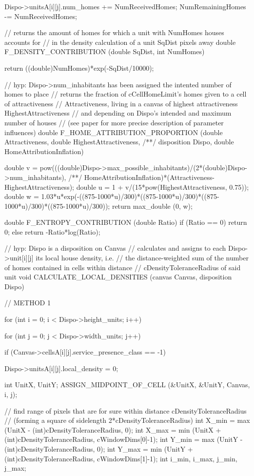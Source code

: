 \begin{C}
{{{			Dispo->unitsA[i][j].num_homes += NumReceivedHomes;
			NumRemainingHomes -= NumReceivedHomes;
		}
	}
	
}

// returns the amount of homes for which a unit with NumHomes houses accounts for
// in the density calculation of a unit SqDist pixels away
double F_DENSITY_CONTRIBUTION (double SqDist, int NumHomes){
	
	return ((double)NumHomes)*exp(-SqDist/10000);
}


// hyp: Dispo->num_inhabitants has been assigned the intented number of homes to place
// returns the fraction of cCellHomeLimit's homes given to a cell of attractiveness
// Attractiveness, living in a canvas of highest attractiveness HighestAttractiveness
// and depending on Dispo's intended and maximum number of houses
// (see paper for more precise description of parameter influences)
double F_HOME_ATTRIBUTION_PROPORTION (double Attractiveness, double HighestAttractiveness,
/**/ disposition Dispo, double HomeAttributionInflation){
	
	double v = pow(((double)Dispo->max_possible_inhabitants)/(2*(double)Dispo->num_inhabitants),
	/**/ HomeAttributionInflation)*(Attractiveness-HighestAttractiveness);
	double u = 1 + v/(15*pow(HighestAttractiveness, 0.75));
	double w = 1.03*u*exp(-((875-1000*u)/300)*((875-1000*u)/300)*((875-1000*u)/300)*((875-1000*u)/300));
	return max_double (0, w);
}


double F_ENTROPY_CONTRIBUTION (double Ratio){
	if (Ratio == 0) return 0;
	else return -Ratio*log(Ratio);
}


// hyp: Dispo is a disposition on Canvas
// calculates and assigns to each Dispo->unit[i][j] its local house density, i.e.
// the distance-weighted sum of the number of homes contained in cells within distance
// cDensityToleranceRadius of said unit
void CALCULATE_LOCAL_DENSITIES (canvas Canvas, disposition Dispo){ // METHOD 1
	
	for (int i = 0; i < Dispo->height_units; i++){
		for (int j = 0; j < Dispo->width_units; j++){
			
			if (Canvas->cellsA[i][j].service_presence_class == -1){
				
				Dispo->unitsA[i][j].local_density = 0;
				
				int UnitX, UnitY;
				ASSIGN_MIDPOINT_OF_CELL (&UnitX, &UnitY, Canvas, i, j);
				
				// find range of pixels that are for sure within distance cDensityToleranceRadius
				// (forming a square of sidelength 2*cDensityToleranceRadius)
				int X_min = max (UnitX - (int)cDensityToleranceRadius, 0);
				int X_max = min (UnitX + (int)cDensityToleranceRadius, cWindowDims[0]-1);
				int Y_min = max (UnitY - (int)cDensityToleranceRadius, 0);
				int Y_max = min (UnitY + (int)cDensityToleranceRadius, cWindowDims[1]-1);
				int i_min, i_max, j_min, j_max;
				
}}}}
\end{C}
